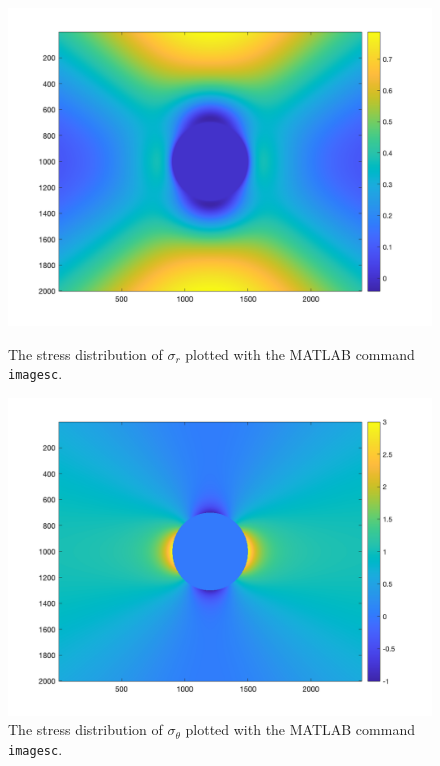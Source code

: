 \documentclass[12 pt]{article}
\begin{document}
\begin{figure}[htbp]
    \centering
    \begin{minipage}{0.45\textwidth}
        \centering
		\includegraphics[width=1.0\textwidth]{images/Graphs/sigma_r}
		\caption{The stress distribution of $\sigma_r$ plotted with the MATLAB command \texttt{imagesc}.}
		\label{fig:sigma_r}
    \end{minipage}\hfill
    \begin{minipage}{0.45\textwidth}
        \centering
		\includegraphics[width=1.0\textwidth]{images/Graphs/sigma_theta}
		\caption{The stress distribution of $\sigma_\theta$ plotted with the MATLAB command \texttt{imagesc}.}
		\label{fig:sigma_theta}
    \end{minipage}
\end{figure}
\end{document}
